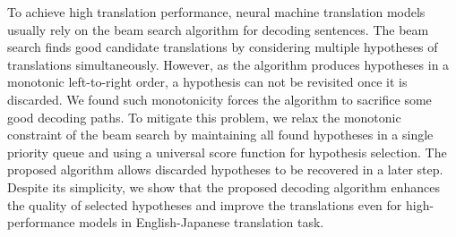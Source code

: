 To achieve high translation performance, neural machine translation models usually rely on the beam search algorithm for decoding sentences. The beam search finds good candidate translations by considering multiple hypotheses of translations simultaneously. However, as the algorithm produces hypotheses in a monotonic left-to-right order, a hypothesis can not be revisited once it is discarded. We found such monotonicity forces the algorithm to sacrifice some good decoding paths. To mitigate this problem, we relax the monotonic constraint of the beam search by maintaining all found hypotheses in a single priority queue and using a universal score function for hypothesis selection. The proposed algorithm allows discarded hypotheses to be recovered in a later step. Despite its simplicity, we show that the proposed decoding algorithm enhances the quality of selected hypotheses and improve the translations even for high-performance models in English-Japanese translation task.
